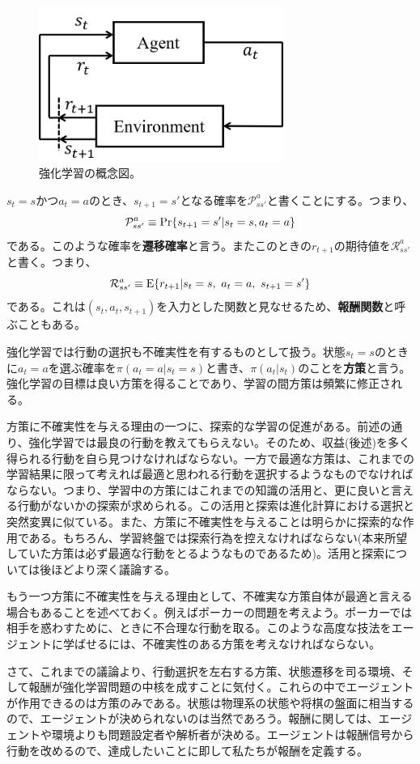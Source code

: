 \documentclass[dvipdfmx, 9pt, a4paper]{jsarticle}
\numberwithin{equation}{section}
\begin{document}
\begin{figure}[b]
\begin{center}
\includegraphics[width=8cm]{fig1_1.png}
\caption{強化学習の概念図。}
\end{center}
\end{figure}

$s_t=s$かつ$a_t=a$のとき、$s_{t+1}=s'$となる確率を$\mathcal{P}^a_{ss'}$と書くことにする。つまり、
\begin{equation}
\mathcal{P}^a_{ss'}\equiv{\rm Pr}\{s_{t+1}=s'|s_t=s,a_t=a\}
\end{equation}
である。このような確率を{\bf 遷移確率}と言う。またこのときの$r_{t+1}$の期待値を$\mathcal{R}^a_{ss'}$と書く。つまり、
\begin{equation}
\mathcal{R}^a_{ss'}\equiv{\rm E}\{r_{t+1}|s_t=s,~a_t=a,~s_{t+1}=s'\}
\end{equation}
である。これは$(s_t,a_t,s_{t+1})$を入力とした関数と見なせるため、{\bf 報酬関数}と呼ぶこともある。\par
強化学習では行動の選択も不確実性を有するものとして扱う。状態$s_t=s$のときに$a_t=a$を選ぶ確率を$\pi(a_t=a|s_t=s)$と書き、$\pi(a_t|s_t)$のことを{\bf 方策}と言う。強化学習の目標は良い方策を得ることであり、学習の間方策は頻繁に修正される。\par
方策に不確実性を与える理由の一つに、探索的な学習の促進がある。前述の通り、強化学習では最良の行動を教えてもらえない。そのため、収益(後述)を多く得られる行動を自ら見つけなければならない。一方で最適な方策は、これまでの学習結果に限って考えれば最適と思われる行動を選択するようなものでなければならない。つまり、学習中の方策にはこれまでの知識の活用と、更に良いと言える行動がないかの探索が求められる。この活用と探索は進化計算における選択と突然変異に似ている。また、方策に不確実性を与えることは明らかに探索的な作用である。もちろん、学習終盤では探索行為を控えなければならない(本来所望していた方策は必ず最適な行動をとるようなものであるため)。活用と探索については後ほどより深く議論する。\par
もう一つ方策に不確実性を与える理由として、不確実な方策自体が最適と言える場合もあることを述べておく。例えばポーカーの問題を考えよう。ポーカーでは相手を惑わすために、ときに不合理な行動を取る。このような高度な技法をエージェントに学ばせるには、不確実性のある方策を考えなければならない。\par
さて、これまでの議論より、行動選択を左右する方策、状態遷移を司る環境、そして報酬が強化学習問題の中核を成すことに気付く。これらの中でエージェントが作用できるのは方策のみである。状態は物理系の状態や将棋の盤面に相当するので、エージェントが決められないのは当然であろう。報酬に関しては、エージェントや環境よりも問題設定者や解析者が決める。エージェントは報酬信号から行動を改めるので、達成したいことに即して私たちが報酬を定義する。
\end{document}
